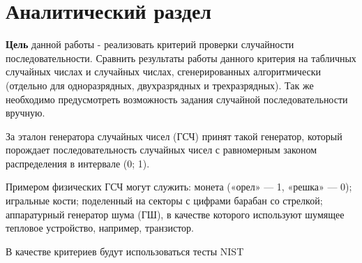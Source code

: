 \chapter{Аналитический раздел}

\textbf{Цель} данной работы - реализовать критерий проверки случайности последовательности. Сравнить результаты работы данного критерия на табличных случайных числах и случайных числах, сгенерированных алгоритмически (отдельно для одноразрядных, двухразрядных и трехразрядных). Так же необходимо предусмотреть возможность
задания случайной последовательности вручную.

За эталон генератора случайных чисел (ГСЧ) принят такой генератор, который порождает последовательность случайных чисел с равномерным законом распределения в интервале (0; 1). \cite{stratum-rand} 

Примером физических ГСЧ могут служить: монета («орел» — 1, «решка» — 0); игральные кости; поделенный на секторы с цифрами барабан со стрелкой; аппаратурный генератор шума (ГШ), в качестве которого используют шумящее тепловое устройство, например, транзистор. \cite{stratum-rand} 

В качестве критериев будут использоваться тесты NIST \cite{habrahabr-nist} 